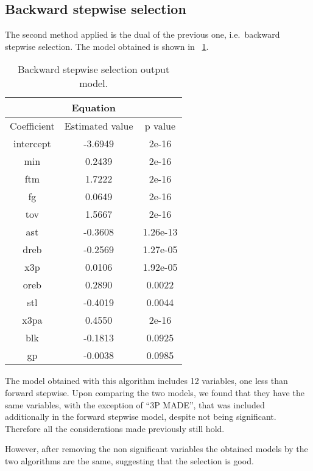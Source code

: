 \subsection{Backward stepwise selection}

The second method applied is the dual of the previous one, i.e.\ backward stepwise selection. The model obtained is shown in \Fig~\ref{table:BackwardModelSummary}.

\begin{table}[h]
	\centering
	\begin{tabular}{||c | c | c ||} 
		\hline
		\multicolumn{3}{|c|}{Equation} \\
		\hline
		Coefficient & Estimated value & p value \\
		\hline
		intercept & -3.6949 & 2e-16 \\
		min & 0.2439 & 2e-16 \\
		ftm & 1.7222 & 2e-16 \\
		fg & 0.0649 & 2e-16 \\
		tov & 1.5667 & 2e-16 \\
		ast & -0.3608 & 1.26e-13 \\
		dreb & -0.2569 & 1.27e-05 \\
		x3p & 0.0106 & 1.92e-05 \\
		oreb & 0.2890 & 0.0022 \\
		stl & -0.4019 & 0.0044 \\
		x3pa & 0.4550 & 2e-16 \\
		blk & -0.1813 & 0.0925 \\
		gp & -0.0038 & 0.0985 \\
		\hline
	\end{tabular}
	\caption{Backward stepwise selection output model.}
	\label{table:BackwardModelSummary}
\end{table}

The model obtained with this algorithm includes 12 variables, one less than forward stepwise. Upon comparing the two models, we found that they have the same variables, with the exception of ``3P MADE'', that was included additionally in the forward stepwise model, despite not being significant.
Therefore all the considerations made previously still hold.

However, after removing the non significant variables the obtained models by the two algorithms are the same, suggesting that the selection is good.